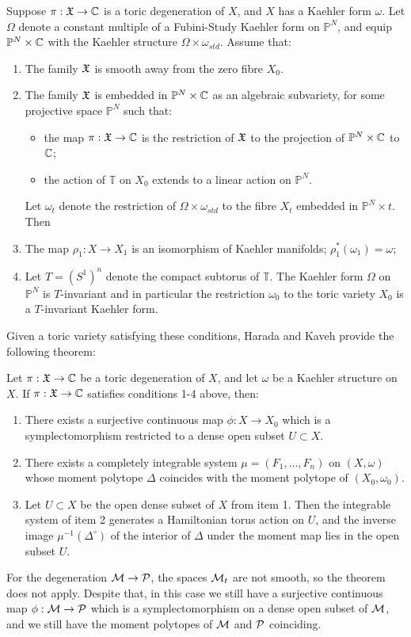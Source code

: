 	Suppose $\pi:\mathfrak{X}\to\mathbb{C}$ is a toric degeneration of $X$, and $X$ has a Kaehler form $\omega$. Let $\Omega$ denote a constant multiple of a Fubini-Study Kaehler form on $\mathbb{P}^N$, and equip $\mathbb{P}^N\times\mathbb{C}$ with the Kaehler structure $\Omega \times \omega_{std}$. Assume that:
	\begin{enumerate}
		\item The family $\mathfrak{X}$ is smooth away from the zero fibre $X_0$.
		\item The family $\mathfrak{X}$ is embedded in $\mathbb{P}^N\times \mathbb{C}$ as an algebraic subvariety, for some projective space $\mathbb{P}^N$ such that:
		\begin{itemize}
			\item the map $\pi:\mathfrak{X}\to\mathbb{C}$ is the restriction of $\mathfrak{X}$ to the projection of $\mathbb{P}^N\times \mathbb{C}$ to $\mathbb{C}$;
			\item the action of $\mathbb{T}$ on $X_0$ extends to a linear action on $\mathbb{P}^N$.
		\end{itemize}
		Let $\omega_t$ denote the restriction of $\Omega\times \omega_{std}$ to the fibre $X_t$ embedded in $\mathbb{P}^N \times {t}$. Then
		\item The map $\rho_1 : X\to X_1$ is an isomorphism of Kaehler manifolds; $\rho_1^\ast(\omega_1) = \omega$;
		\item Let $T = (S^1)^n$ denote the compact subtorus of $\mathbb{T}$. The Kaehler form $\Omega$ on $\mathbb{P}^N$ is $T$-invariant and in particular the restriction $\omega_0$ to the toric variety $X_0$ is a $T$-invariant Kaehler form.
	\end{enumerate}
	Given a toric variety satisfying these conditions, Harada and Kaveh provide the following theorem:
	\begin{theorem}
		\label{t:haradakaveh}
		Let $\pi:\mathfrak{X}\to \mathbb{C}$ be a toric degeneration of $X$, and let $\omega$ be a Kaehler structure on $X$. If $\pi:\mathfrak{X}\to\mathbb{C}$ satisfies conditions 1-4 above, then:
		\begin{enumerate}
			\item There exists a surjective continuous map $\phi:X\to X_0$ which is a symplectomorphism restricted to a dense open subset $U\subset X$.
			\item There exists a completely integrable system $\mu = (F_1,...,F_n)$ on $(X,\omega)$ whose moment polytope $\Delta$ coincides with the moment polytope of $(X_0, \omega_0)$.
			\item Let $U\subset X$ be the open dense subset of $X$ from item 1. Then the integrable system of item 2 generates a Hamiltonian torus action on $U$, and the inverse image $\mu^{-1}(\Delta^\circ)$ of the interior of $\Delta$ under the moment map lies in the open subset $U$.
		\end{enumerate}
	\end{theorem}
	
	For the degeneration $\mathcal{M}\to \mathcal{P}$, the spaces $\mathcal{M}_t$ are not smooth, so the theorem does not apply. Despite that, in this case we still have a surjective continuous map $\phi:\mathcal{M}\to \mathcal{P}$ which is a symplectomorphism on a dense open subset of $\mathcal{M}$, and we still have the moment polytopes of $\mathcal{M}$ and $\mathcal{P}$ coinciding. 
	